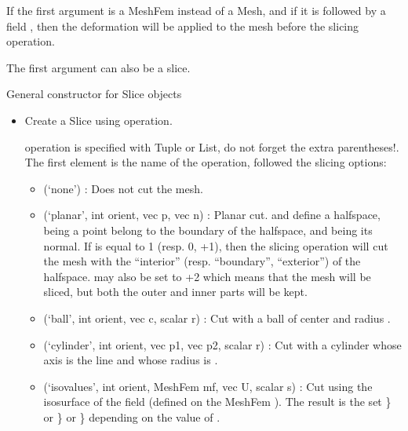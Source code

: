 \documentclass[a4paper,11pt,english]{sphinxmanual}
\begin{document}
\begin{fulllineitems}
If the first argument is a MeshFem  instead of a Mesh, and if it is
followed by a \sphinxhyphen{}field , then the deformation  will be applied to the
mesh before the slicing operation.

The first argument can also be a slice.

General constructor for Slice objects
\begin{itemize}
\item {} 
Create a Slice using  operation.

 operation is specified with  Tuple
or List, do not forget the extra parentheses!. The first element is the
name of the operation, followed the slicing options:
\begin{itemize}
\item {} 
(‘none’) :
Does not cut the mesh.

\item {} 
(‘planar’, int orient, vec p, vec n) :
Planar cut.  and  define a half\sphinxhyphen{}space,  being a point belong to
the boundary of the half\sphinxhyphen{}space, and  being its normal. If  is
equal to \sphinxhyphen{}1 (resp. 0, +1), then the slicing operation will cut the mesh
with the “interior” (resp. “boundary”, “exterior”) of the half\sphinxhyphen{}space.
 may also be set to +2 which means that the mesh will be sliced,
but both the outer and inner parts will be kept.

\item {} 
(‘ball’, int orient, vec c, scalar r) :
Cut with a ball of center  and radius .

\item {} 
(‘cylinder’, int orient, vec p1, vec p2, scalar r) :
Cut with a cylinder whose axis is the line  and whose radius
is .

\item {} 
(‘isovalues’, int orient, MeshFem mf, vec U, scalar s) :
Cut using the isosurface of the field  (defined on the MeshFem ).
The result is the set \}\textasciigrave{} or \}\textasciigrave{} or \}\textasciigrave{} depending on the value of
.


\end{itemize}
\end{itemize}
\end{fulllineitems}
\end{document}
